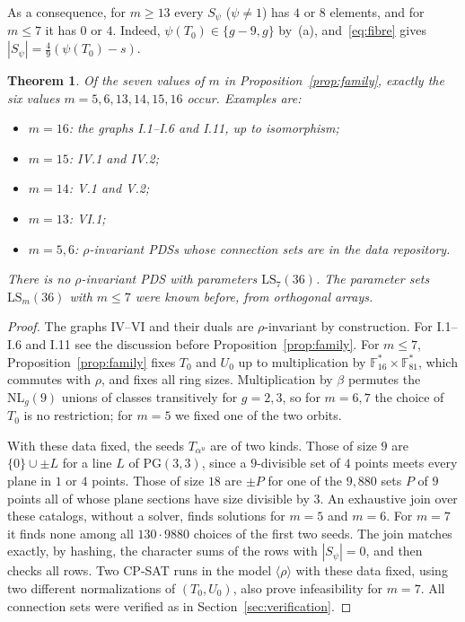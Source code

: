 \documentclass[11pt]{amsart}
\newtheorem{theorem}{Theorem}[section]
\theoremstyle{definition}
\newcommand{\F}{\mathbb{F}}
\newcommand{\LS}{\mathrm{LS}}
\newcommand{\NL}{\mathrm{NL}}
\begin{document}
As a consequence, for $m\ge13$ every $S_\psi$ ($\psi\ne1$) has $4$ or $8$ elements, and for $m\le7$ it has $0$ or $4$. Indeed, $\psi(T_0)\in\{g-9,g\}$ by~(a), and~\eqref{eq:fibre} gives $|S_\psi|=\frac49(\psi(T_0)-s)$.

\begin{theorem}\label{thm:familyexact}
Of the seven values of $m$ in Proposition~\ref{prop:family}, exactly the six values $m=5,6,13,14,15,16$ occur. Examples are:
\begin{itemize}
\item $m=16$: the graphs I.1--I.6 and I.11, up to isomorphism;
\item $m=15$: IV.1 and IV.2;
\item $m=14$: V.1 and V.2;
\item $m=13$: VI.1;
\item $m=5,6$: $\rho$-invariant PDSs whose connection sets are in the data repository.
\end{itemize}
There is no $\rho$-invariant PDS with parameters $\LS_7(36)$. The parameter sets $\LS_m(36)$ with $m\le7$ were known before, from orthogonal arrays.
\end{theorem}

\begin{proof}
The graphs IV--VI and their duals are $\rho$-invariant by construction. For I.1--I.6 and I.11 see the discussion before Proposition~\ref{prop:family}. For $m\le7$, Proposition~\ref{prop:family} fixes $T_0$ and $U_0$ up to multiplication by $\F_{16}^*\times\F_{81}^*$, which commutes with $\rho$, and fixes all ring sizes. Multiplication by $\beta$ permutes the $\NL_g(9)$ unions of classes transitively for $g=2,3$, so for $m=6,7$ the choice of $T_0$ is no restriction; for $m=5$ we fixed one of the two orbits.

With these data fixed, the seeds $T_{\alpha^u}$ are of two kinds. Those of size $9$ are $\{0\}\cup\pm L$ for a line $L$ of $\mathrm{PG}(3,3)$, since a $9$-divisible set of $4$ points meets every plane in $1$ or $4$ points. Those of size $18$ are $\pm P$ for one of the $9{,}880$ sets $P$ of $9$ points all of whose plane sections have size divisible by $3$. An exhaustive join over these catalogs, without a solver, finds solutions for $m=5$ and $m=6$. For $m=7$ it finds none among all $130\cdot 9880$ choices of the first two seeds. The join matches exactly, by hashing, the character sums of the rows with $|S_\psi|=0$, and then checks all rows. Two CP-SAT runs in the model $\langle\rho\rangle$ with these data fixed, using two different normalizations of $(T_0,U_0)$, also prove infeasibility for $m=7$. All connection sets were verified as in Section~\ref{sec:verification}.
\end{proof}
\end{document}
